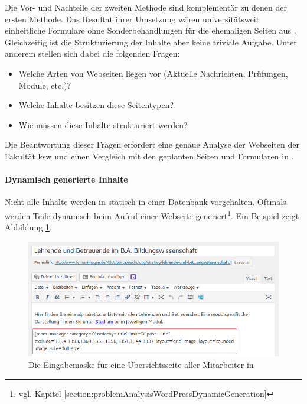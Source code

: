         Die Vor- und Nachteile der zweiten Methode sind komplementär zu denen der ersten Methode.
        Das Resultat ihrer Umsetzung wären universitätsweit einheitliche Formulare
        ohne Sonderbehandlungen für die ehemaligen Seiten aus {\wordpress}.
        Gleichzeitig ist die Strukturierung der Inhalte aber keine triviale Aufgabe.
        Unter anderem stellen sich dabei die folgenden Fragen:

        \begin{itemize}
            \item Welche Arten von Webseiten liegen vor (Aktuelle Nachrichten, Prüfungen, Module, etc.)?
            \item Welche Inhalte besitzen diese Seitentypen?
            \item Wie müssen diese Inhalte strukturiert werden?
        \end{itemize}

        Die Beantwortung dieser Fragen erfordert eine genaue Analyse der Webseiten der Fakultät \gls{ksw}
        und einen Vergleich mit den geplanten Seiten und Formularen in {\imperia}.
        
        \paragraph{Dynamisch generierte Inhalte}
        Nicht alle Inhalte werden in {\wordpress} statisch in einer Datenbank vorgehalten.
        Oftmals werden Teile dynamisch beim Aufruf einer Webseite
        generiert\footnote{vgl. Kapitel \ref{section:problemAnalysisWordPressDynamicGeneration}}.
        Ein Beispiel zeigt Abbildung \ref{image:introductionFernUniWordpressOverviewForm}.

        \begin{figure}[htb]
            \centering
            \includegraphics[scale=0.6]{../resources/wordpress/teachers-overview.png}
            \caption{Die Eingabemaske für eine Übersichtsseite aller Mitarbeiter in {\wordpress}}
            \label{image:introductionFernUniWordpressOverviewForm}
        \end{figure}

